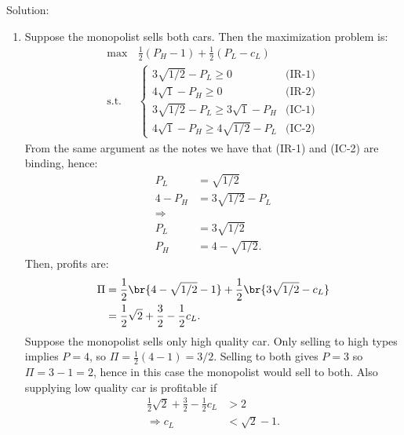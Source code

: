 \begin{enumerate}
	      Solution:
	      \begin{enumerate}
		      \item Suppose the monopolist sells both cars. Then the maximization problem is:
		            \begin{align*}
			            \max\,       & \frac{1}{2}(P_H-1)+\frac{1}{2}(P_L-c_L)          \\
			            \text{s.t. } & \begin{cases}
				                           3\sqrt{1/2}-P_L\geq0             & \text{(IR-1)} \\
				                           4\sqrt{1}-P_H\geq0               & \text{(IR-2)} \\
				                           3\sqrt{1/2}-P_L\geq3\sqrt{1}-P_H & \text{(IC-1)} \\
				                           4\sqrt{1}-P_H\geq4\sqrt{1/2}-P_L & \text{(IC-2)}
			                           \end{cases}
		            \end{align*}
		            From the same argument as the notes we have that (IR-1) and (IC-2) are binding, hence:
		            \begin{align*}
			            P_L   & =\sqrt{1/2}      \\
			            4-P_H & =3\sqrt{1/2}-P_L \\
			            \Longrightarrow          \\
			            P_L   & =3\sqrt{1/2}     \\
			            P_H   & =4-\sqrt{1/2}.
		            \end{align*}
		            Then, profits are:
		            \begin{align*}
			            \Pi & =\frac{1}{2}\br{4-\sqrt{1/2}-1}+\frac{1}{2}\br{3\sqrt{1/2}-c_L} \\
			                & =\frac{1}{2}\sqrt2 +\frac{3}{2}-\frac{1}{2}c_L.
		            \end{align*}
		            Suppose the monopolist sells only high quality car. Only selling to high types implies
		            $P=4$, so $\Pi=\frac{1}{2}(4-1)=3/2$. Selling to both gives $P=3$ so
		            $\Pi=3-1=2$, hence in this case the monopolist would sell to both. Also supplying low quality car
		            is profitable if
		            \begin{align*}
			            \frac{1}{2}\sqrt2 +\frac{3}{2}-\frac{1}{2}c_L & >2         \\
			            \Longrightarrow c_L                           & <\sqrt2-1.

\end{align*}
\end{enumerate}
\end{enumerate}
